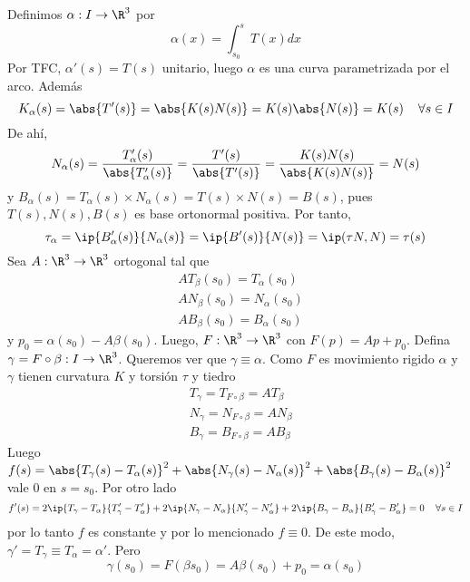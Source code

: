 \documentclass{article}
\begin{document}
\begin{dem}
    \noindent Definimos $\alpha:I\to\R^{3}$ por
    \begin{equation*}
        \alpha(x)=\int_{s_{0}}^{s}T(x)dx
    \end{equation*}
    Por TFC, $\alpha'(s)=T(s)$ unitario, luego $\alpha$ es una curva parametrizada por el arco.
    Además
    \begin{equation*}
        K_{\alpha}(s)=\abs{T'(s)}=\abs{K(s)N(s)}=K(s)\abs{N(s)}=K(s)\hspace{4mm}\forall s\in I
    \end{equation*}
    De ahí,
    \begin{equation*}
        N_{\alpha}(s)=\frac{T'_{\alpha}(s)}{\abs{T'_{\alpha}(s)}}=\frac{T'(s)}{\abs{T'(s)}}=
        \frac{K(s)N(s)}{\abs{K(s)N(s)}}=N(s)
    \end{equation*}
    y $B_{\alpha}(s)=T_{\alpha}(s)\times N_{\alpha}(s)=T(s)\times N(s)=B(s)$, pues $T(s),N(s),B(s)$
    es base ortonormal positiva. Por tanto,
    \begin{equation*}
        \tau_{\alpha}=\ip{B'_{\alpha}(s)}{N_{\alpha}(s)}=\ip{B'(s)}{N(s)}=\ip(\tau N,N)=\tau(s)
    \end{equation*}
    Sea $A:\R^{3}\to\R^{3}$ ortogonal tal que
    \begin{align*}
        & AT_{\beta}(s_{0})=T_{\alpha}(s_{0}) \\
        & AN_{\beta}(s_{0})=N_{\alpha}(s_{0}) \\
        & AB_{\beta}(s_{0})=B_{\alpha}(s_{0})
    \end{align*}
    y $p_{0}=\alpha(s_{0})-A\beta(s_{0})$. Luego, $F:\R^{3}\to\R^{3}$ con $F(p)=Ap+p_{0}$. Defina
    $\gamma=F\circ\beta:I\to\R^{3}$. Queremos ver que $\gamma\equiv\alpha$. Como $F$ es movimiento
    rigido $\alpha$ y $\gamma$ tienen curvatura $K$ y torsión $\tau$ y tiedro
    \begin{align*}
        & T_{\gamma}=T_{F\circ\beta}=AT_{\beta} \\
        & N_{\gamma}=N_{F\circ\beta}=AN_{\beta} \\
        & B_{\gamma}=B_{F\circ\beta}=AB_{\beta}
    \end{align*}
    Luego
    $f(s)=\abs{T_{\gamma}(s)-T_{\alpha}(s)}^{2}+
    \abs{N_{\gamma}(s)-N_{\alpha}(s)}^{2}+\abs{B_{\gamma}(s)-B_{\alpha}(s)}^{2}$
    vale $0$ en $s=s_{0}$. Por otro lado
    \begin{equation*}
        f'(s)=2\ip{T_{\gamma}-T_{\alpha}}{T'_{\gamma}-T'_{\alpha}}
        +2\ip{N_{\gamma}-N_{\alpha}}{N'_{\gamma}-N'_{\alpha}}
        +2\ip{B_{\gamma}-B_{\alpha}}{B'_{\gamma}-B'_{\alpha}}=0\hspace{4mm}\forall s\in I
    \end{equation*}
    por lo tanto $f$ es constante y por lo mencionado $f\equiv0$. De este modo, 
    $\gamma'=T_{\gamma}\equiv T_{\alpha}=\alpha'$. Pero 
    \begin{equation*}
        \gamma(s_{0})=F(\beta{s_{0}})=A\beta(s_{0})+p_{0}=\alpha(s_{0})
    \end{equation*}
\end{dem}
\end{document}
